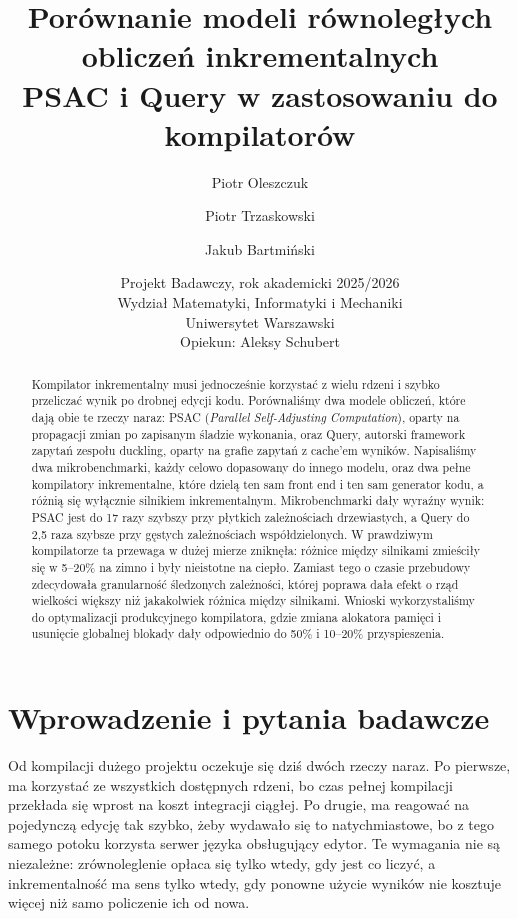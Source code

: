 \documentclass[11pt,a4paper]{article}
\title{\vspace{-1.2cm}Porównanie modeli równoległych obliczeń inkrementalnych\\
       PSAC i Query w zastosowaniu do kompilatorów}
\author{Piotr Oleszczuk \and Piotr Trzaskowski \and Jakub Bartmiński} %
\date{Projekt Badawczy, rok akademicki 2025/2026\\
      Wydział Matematyki, Informatyki i Mechaniki\\
      Uniwersytet Warszawski\\[2pt]
      Opiekun: Aleksy Schubert}
\begin{document}
\maketitle

\begin{abstract}
Kompilator inkrementalny musi jednocześnie korzystać z wielu rdzeni i szybko %
przeliczać wynik po drobnej edycji kodu. Porównaliśmy dwa modele obliczeń, które
dają obie te rzeczy naraz: PSAC (\emph{Parallel Self-Adjusting Computation}),
oparty na propagacji zmian po zapisanym śladzie wykonania, oraz Query, autorski
framework zapytań zespołu duckling, oparty na grafie zapytań z cache'em wyników. %
Napisaliśmy dwa mikrobenchmarki, każdy celowo dopasowany do innego modelu, oraz
dwa pełne kompilatory inkrementalne, które dzielą ten sam front end i ten sam
generator kodu, a różnią się wyłącznie silnikiem inkrementalnym. Mikrobenchmarki
dały wyraźny wynik: PSAC jest do 17 razy szybszy przy płytkich zależnościach
drzewiastych, a Query do 2,5 raza szybsze przy gęstych zależnościach
współdzielonych. W prawdziwym kompilatorze ta przewaga w dużej mierze zniknęła:
różnice między silnikami zmieściły się w 5--20\% na zimno i były nieistotne na %
ciepło. Zamiast tego o czasie przebudowy zdecydowała granularność śledzonych
zależności, której poprawa dała efekt o rząd wielkości większy niż jakakolwiek
różnica między silnikami. Wnioski wykorzystaliśmy do optymalizacji produkcyjnego %
kompilatora, gdzie zmiana alokatora pamięci i usunięcie globalnej blokady dały %
odpowiednio do 50\% i 10--20\% przyspieszenia.
\end{abstract}

\section{Wprowadzenie i pytania badawcze}

Od kompilacji dużego projektu oczekuje się dziś dwóch rzeczy naraz. Po pierwsze,
ma korzystać ze wszystkich dostępnych rdzeni, bo czas pełnej kompilacji przekłada
się wprost na koszt integracji ciągłej. Po drugie, ma reagować na pojedynczą
edycję tak szybko, żeby wydawało się to natychmiastowe, bo z tego samego potoku
korzysta serwer języka obsługujący edytor. Te wymagania nie są niezależne:
zrównoleglenie opłaca się tylko wtedy, gdy jest co liczyć, a inkrementalność ma
sens tylko wtedy, gdy ponowne użycie wyników nie kosztuje więcej niż samo
policzenie ich od nowa.
\end{document}
